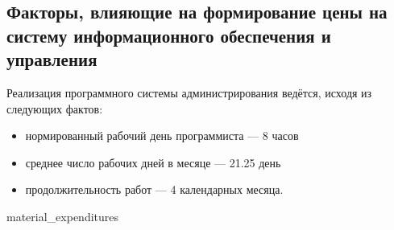 \subsection{Факторы, влияющие на формирование цены на систему информационного обеспечения и управления}
Реализация программного системы администрирования ведётся, исходя из следующих фактов:
\begin{itemize}
\item нормированный рабочий день программиста --– 8 часов
\item среднее число рабочих дней в месяце –-- 21.25 день
\item продолжительность работ --- 4 календарных месяца.
\end{itemize}

{material_expenditures}

